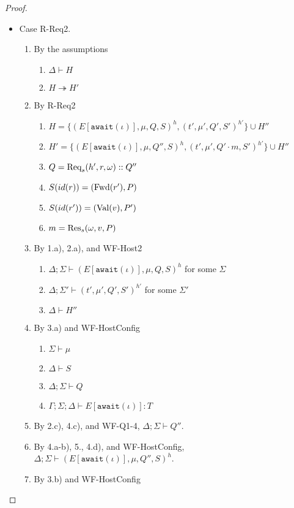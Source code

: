 \begin{proof}
\begin{itemize}
\item Case R-Req2.
\begin{enumerate}
\item By the assumptions
  \begin{enumerate}[label=(\alph*)]
  \item $\Delta \vdash H$
  \item $H \twoheadrightarrow H'$
  \end{enumerate}
\item By R-Req2
  \begin{enumerate}[label=(\alph*)]
  \item $H = \{ (E[\texttt{await}(\iota)], \mu, Q, S)^h, (t', \mu', Q', S')^{h'} \} \cup H''$
  \item $H' = \{ (E[\texttt{await}(\iota)], \mu, Q'', S)^h, (t', \mu', Q' \cdot m, S')^{h'} \} \cup H''$
  \item $Q         = {\textrm{Req}_s(h', r, \omega)} :: Q''$
  \item $S(id(r))  = (\textrm{Fwd}(r'), P)$
  \item $S(id(r')) = (\textrm{Val}(v), P')$
  \item $m         = {\textrm{Res}_s(\omega, v, P)}$
  \end{enumerate}
\item By 1.a), 2.a), and WF-Host2
  \begin{enumerate}[label=(\alph*)]
  \item $\Delta ; \Sigma \vdash (E[\texttt{await}(\iota)], \mu, Q, S)^h$ for some $\Sigma$
  \item $\Delta ; \Sigma' \vdash (t', \mu', Q', S')^{h'}$ for some $\Sigma'$
  \item $\Delta \vdash H''$
  \end{enumerate}
\item By 3.a) and WF-HostConfig
  \begin{enumerate}[label=(\alph*)]
  \item $\Sigma \vdash \mu$
  \item $\Delta \vdash S$
  \item $\Delta ; \Sigma \vdash Q$
  \item $\Gamma ; \Sigma ; \Delta \vdash E[\texttt{await}(\iota)] : T$
  \end{enumerate}
\item By 2.c), 4.c), and WF-Q1-4, $\Delta ; \Sigma \vdash Q''$.
\item By 4.a-b), 5., 4.d), and WF-HostConfig, $\Delta ; \Sigma \vdash (E[\texttt{await}(\iota)], \mu, Q'', S)^h$.
\item By 3.b) and WF-HostConfig

\end{enumerate}
\end{itemize}
\end{proof}
